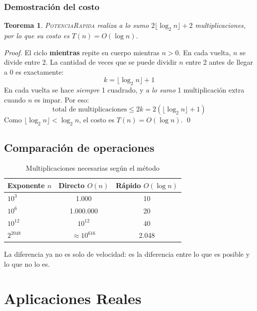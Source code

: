 \documentclass[twocolumn, 10pt]{article}
\newtheorem{theorem}{Teorema}
\begin{document}
\subsubsection{Demostración del costo}

\begin{theorem}
\textsc{PotenciaRapida} realiza a lo sumo $2\lfloor \log_2 n \rfloor + 2$
multiplicaciones, por lo que su costo es $T(n) = O(\log n)$.
\end{theorem}

\begin{proof}
El ciclo \textbf{mientras} repite su cuerpo mientras $n > 0$. En cada
vuelta, $n$ se divide entre 2. La cantidad de veces que se puede dividir
$n$ entre 2 antes de llegar a 0 es exactamente:
\[
  k = \lfloor \log_2 n \rfloor + 1
\]
En cada vuelta se hace \emph{siempre} 1 cuadrado, y \emph{a lo sumo}
1 multiplicación extra cuando $n$ es impar. Por eso:
\[
  \text{total de multiplicaciones} \leq 2k = 2(\lfloor \log_2 n \rfloor + 1)
\]
Como $\lfloor \log_2 n \rfloor < \log_2 n$, el costo es $T(n) = O(\log n)$.
\qed
\end{proof}

\subsection{Comparación de operaciones}

\begin{table}[H]
\centering
\caption{Multiplicaciones necesarias según el método}
\small
\begin{tabular}{@{}lcc@{}}
\toprule
Exponente $n$ & Directo $O(n)$ & Rápido $O(\log n)$ \\
\midrule
$10^3$     & 1.000             & 10 \\
$10^6$     & 1.000.000         & 20 \\
$10^{12}$  & $10^{12}$         & 40 \\
$2^{2048}$ & $\approx 10^{616}$ & 2.048 \\
\bottomrule
\end{tabular}
\end{table}

La diferencia ya no es solo de velocidad: es la diferencia entre
lo que es posible y lo que no lo es.

\section{Aplicaciones Reales}
\end{document}
